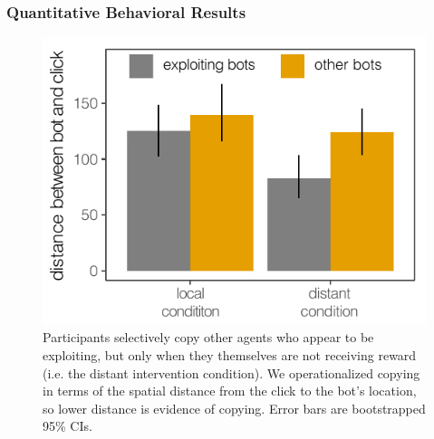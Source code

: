 \documentclass[12pt,letterpaper]{article}
\begin{document}
\subsubsection{Quantitative Behavioral Results}

\begin{figure}[th!]
    \centering
    \includegraphics[width=0.8\linewidth]{figures/proximity.pdf}
    \vspace{-1em}
    \caption{Participants selectively copy other agents who appear to be exploiting, but only when they themselves are not receiving reward (i.e. the distant intervention condition). We operationalized copying in terms of the spatial distance from the click to the bot's location, so lower distance is evidence of copying. Error bars are bootstrapped 95\% CIs.} %
    \label{fig:proximity}
\end{figure}
\end{document}
